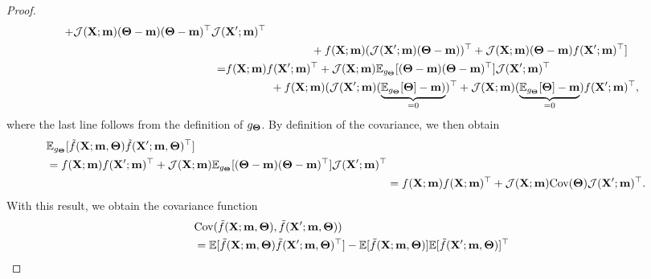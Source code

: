 \begin{appendices}
\begin{proof}
\begin{align}
\begin{split}
    + 
    \mathcal{J}(\mathbf X ; \mathbf{m}) (\boldsymbol{\Theta} - \mathbf{m}) (\boldsymbol{\Theta} - \mathbf{m})^\top \mathcal{J}(\mathbf X' ; \mathbf{m})^\top
    \\
    &\qquad \qquad + f(\mathbf X ; \mathbf{m}) (\mathcal{J}(\mathbf X' ; \mathbf{m})(\boldsymbol{\Theta} - \mathbf{m}))^\top
    + \mathcal{J}(\mathbf X ; \mathbf{m})(\boldsymbol{\Theta} - \mathbf{m}) f(\mathbf X' ; \mathbf{m})^\top ]
    \end{split}
    \\
    \begin{split}
    =
    & f(\mathbf X ; \mathbf{m}) f(\mathbf X' ; \mathbf{m})^\top 
    + 
    \mathcal{J}(\mathbf X ; \mathbf{m}) \mathbb{E}_{g_{\boldsymbol{\Theta}}}[ (\boldsymbol{\Theta} - \mathbf{m}) (\boldsymbol{\Theta} - \mathbf{m})^\top ] \mathcal{J}(\mathbf X' ; \mathbf{m})^\top
    \\
    &\qquad \qquad + f(\mathbf X ; \mathbf{m}) (\mathcal{J}(\mathbf X' ; \mathbf{m})(\underbrace{\mathbb{E}_{g_{\boldsymbol{\Theta}}}[\boldsymbol{\Theta}] - \mathbf{m})}_{=0})^\top
    + \mathcal{J}(\mathbf X ; \mathbf{m})(\underbrace{\mathbb{E}_{g_{\boldsymbol{\Theta}}}[\boldsymbol{\Theta}] - \mathbf{m}}_{=0}) f(\mathbf X' ; \mathbf{m})^\top,
    \end{split}
    \end{align}
    where the last line follows from the definition of $g_{\boldsymbol{\Theta}}$.
    By definition of the covariance, we then obtain
    \begin{align}
    \begin{split}
    &
    \mathbb{E}_{g_{\boldsymbol{\Theta}}}[ \smash{\tilde{f}}(\mathbf X ; \mathbf{m}, \boldsymbol{\Theta}) \smash{\tilde{f}}(\mathbf X'; \mathbf{m}, \boldsymbol{\Theta})^\top ]
    \\
    &=
    f(\mathbf X ; \mathbf{m}) f(\mathbf X' ; \mathbf{m})^\top 
    + 
    \mathcal{J}(\mathbf X ; \mathbf{m}) \mathbb{E}_{g_{\boldsymbol{\Theta}}}[ (\boldsymbol{\Theta} - \mathbf{m}) (\boldsymbol{\Theta} - \mathbf{m})^\top ] \mathcal{J}(\mathbf X' ; \mathbf{m})^\top
    \end{split}
    \\
    &=
     f(\mathbf X ; \mathbf{m}) f(\mathbf X ; \mathbf{m})^\top 
    + 
    \mathcal{J}(\mathbf X ; \mathbf{m}) \text{Cov}( \boldsymbol{\Theta} ) \mathcal{J}(\mathbf X' ; \mathbf{m})^\top.
\end{align}
With this result, we obtain the covariance function
\begin{align}
\begin{split}
    &
    \textrm{Cov}(\flin(\bX ; \mathbf{m}, \bTheta), \flin(\bX'; \mathbf{m}, \bTheta))
    \\
    &=
    \mathbb{E}[ \flin(\bX ; \mathbf{m}, \bTheta) \flin(\bX'; \mathbf{m}, \bTheta)^\top ] - \mathbb{E}[\flin(\bX ; \mathbf{m}, \bTheta)] \mathbb{E}[\flin(\bX'; \mathbf{m}, \bTheta)]^\top
    \end{split}
    \\

\end{align}
\end{proof}
\end{appendices}
